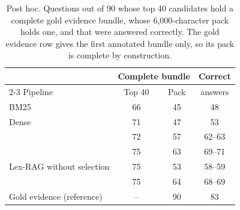 \begin{table}[t]
\centering
\footnotesize
\setlength{\tabcolsep}{4pt}
\begin{tabular}{@{}lccc@{}}
\toprule
 & \multicolumn{2}{c}{Complete bundle} & Correct \\
\cmidrule(lr){2-3}
Pipeline & Top 40 & Pack & answers \\
\midrule
BM25 & 66 & 45 & 48 \\
Dense & 71 & 47 & 53 \\
\hybrid{} & 72 & 57 & 62--63 \\
\hr{} & 75 & 63 & 69--71 \\
Lex-RAG without selection & 75 & 53 & 58--59 \\
\lexb{} & 75 & 64 & 68--69 \\
Gold evidence (reference) & -- & 90 & 83 \\
\bottomrule
\end{tabular}
\caption{Post hoc. Questions out of 90 whose top 40 candidates hold a complete gold evidence bundle, whose 6,000-character pack holds one, and that were answered correctly. The gold evidence row gives the first annotated bundle only, so its pack is complete by construction.}
\label{tab:funnel}
\end{table}
